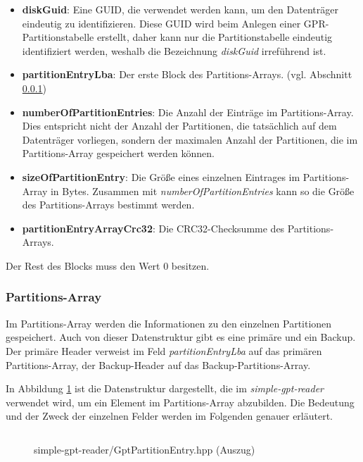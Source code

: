 \begin{itemize}
    \item \textbf{diskGuid}:
    Eine GUID, die verwendet werden kann, um den Datenträger eindeutig zu identifizieren.\cite{uefi-spec}
    Diese GUID wird beim Anlegen einer GPR-Partitionstabelle erstellt, daher kann nur die Partitionstabelle eindeutig identifiziert werden, weshalb die Bezeichnung \textit{diskGuid} irreführend ist.

    \item \textbf{partitionEntryLba}:
    Der erste Block des Partitions-Arrays. (vgl. Abschnitt \ref{sec:gpt:structure:entry-array})

    \item \textbf{numberOfPartitionEntries}:
    Die Anzahl der Einträge im Partitions-Array.
    Dies entspricht nicht der Anzahl der Partitionen, die tatsächlich auf dem Datenträger vorliegen, sondern der maximalen Anzahl der Partitionen, die im Partitions-Array gespeichert werden können.

    \item \textbf{sizeOfPartitionEntry}:
    Die Größe eines einzelnen Eintrages im Partitions-Array in Bytes.
    Zusammen mit \textit{numberOfPartitionEntries} kann so die Größe des Partitions-Arrays bestimmt werden.

    \item \textbf{partitionEntryArrayCrc32}:
    Die CRC32-Checksumme des Partitions-Arrays.
    
\end{itemize}

Der Rest des Blocks muss den Wert 0 besitzen.

\subsubsection{Partitions-Array}
\label{sec:gpt:structure:entry-array}
Im Partitions-Array werden die Informationen zu den einzelnen Partitionen gespeichert.
Auch von dieser Datenstruktur gibt es eine primäre und ein Backup.
Der primäre Header verweist im Feld \textit{partitionEntryLba} auf das primären Partitions-Array, der Backup-Header auf das Backup-Partitions-Array.

In Abbildung \ref{fig:GptPartitionEntry.hpp} ist die Datenstruktur dargestellt, die im \textit{simple-gpt-reader} verwendet wird, um ein Element im Partitions-Array abzubilden.
Die Bedeutung und der Zweck der einzelnen Felder werden im Folgenden genauer erläutert.

\begin{figure}[ht]
    \inputminted[baselinestretch=1.2, linenos, tabsize=4, breaklines, frame=single]{c++}{content/code/simple-gpt-reader/GptPartitionEntry.hpp}
    
    \caption{simple-gpt-reader/GptPartitionEntry.hpp (Auszug)}
    \label{fig:GptPartitionEntry.hpp}
\end{figure}

